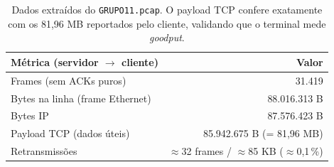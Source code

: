 \documentclass[12pt,a4paper]{article}
\begin{document}
\begin{table}[H]
\centering
\begin{tabular}{@{}lr@{}}
    \toprule
    \textbf{Métrica (servidor $\to$ cliente)} & \textbf{Valor} \\
    \midrule
    Frames (sem ACKs puros)               & 31.419 \\
    Bytes na linha (frame Ethernet)       & 88.016.313 B \\
    Bytes IP                              & 87.576.423 B \\
    Payload TCP (dados úteis)             & 85.942.675 B (= 81,96 MB) \\
    Retransmissões                        & $\approx$32 frames / $\approx$85 KB ($\approx$0,1\,\%) \\
    \bottomrule
\end{tabular}
\caption{Dados extraídos do \texttt{GRUPO11.pcap}. O payload TCP confere exatamente com
os 81,96 MB reportados pelo cliente, validando que o terminal mede \textit{goodput}.}
\end{table}
\end{document}

